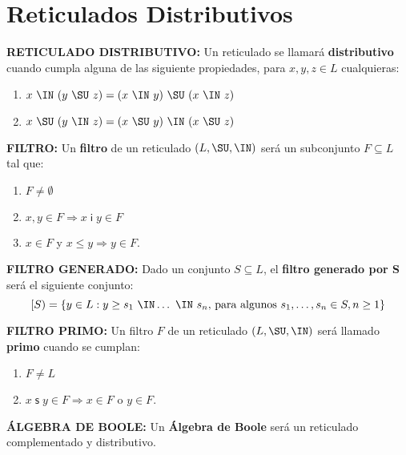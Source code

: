 \section{Reticulados Distributivos}

  \PN \textbf{RETICULADO DISTRIBUTIVO:} Un reticulado se llamará \textbf{distributivo} cuando cumpla alguna de las
  siguiente propiedades, para $x, y, z \in L$ cualquieras:
  \begin{enumerate}
    \item $x \ \IN \ (y \ \SU \ z) = (x \ \IN \ y) \ \SU \ (x \ \IN \ z)$
    \item $x \ \SU \ (y \ \IN \ z) = (x \ \SU \ y) \ \IN \ (x \ \SU \ z)$
  \end{enumerate}

  \vspace{3mm}
  \PN \textbf{FILTRO:} Un \textbf{filtro} de un reticulado $(L,\SU,\IN)$ será un subconjunto
  $F \subseteq L$ tal que:
  \begin{enumerate}
    \item $F\neq \emptyset $
    \item $x,y\in F\Rightarrow x\;\mathsf{i\;}y\in F$
    \item $x\in F$ y $x\leq y\Rightarrow y\in F$.
  \end{enumerate}

  \vspace{3mm}
  \PN \textbf{FILTRO GENERADO:} Dado un conjunto $S \subseteq L$, el \textbf{filtro generado por S} será el siguiente
  conjunto:
  \[
    [S) = \{y \in L: y \geq s_{1} \ \IN \dotsc \ \IN \ s_{n} \text{, para algunos } s_{1}, \dotsc, s_{n} \in S, n \geq
    1\}
  \]

  \vspace{3mm}
  \PN \textbf{FILTRO PRIMO:} Un filtro $F$ de un reticulado $(L,\SU,\IN)$ será llamado \textbf{primo}
  cuando se cumplan:
  \begin{enumerate}
    \item $F\neq L$
    \item $x\;\mathsf{s\;}y\in F\Rightarrow x\in F$ o $y\in F$.
  \end{enumerate}

  \vspace{3mm}
  \PN \textbf{ÁLGEBRA DE BOOLE:} Un \textbf{Álgebra de Boole} será un reticulado complementado y distributivo.
